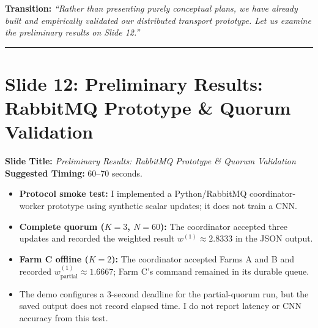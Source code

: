 \documentclass[11pt,a4paper]{article}
\begin{document}
\textbf{Transition:} \textit{``Rather than presenting purely conceptual plans, we have already built and empirically validated our distributed transport prototype. Let us examine the preliminary results on Slide 12.''}

\vspace{0.35cm}\hrule\vspace{0.35cm}

\section{Slide 12: Preliminary Results: RabbitMQ Prototype \& Quorum Validation}
\textbf{Slide Title:} \textit{Preliminary Results: RabbitMQ Prototype \& Quorum Validation} \\
\textbf{Suggested Timing:} 60--70 seconds.

\begin{tcolorbox}[colframe=primaryblue, title=\textbf{Key Distributed Systems Points to Emphasize}]
\begin{itemize}[leftmargin=*]
    \item \textbf{Protocol smoke test:} I implemented a Python/RabbitMQ coordinator-worker prototype using synthetic scalar updates; it does not train a CNN.
    \item \textbf{Complete quorum ($K=3$, $N=60$):} The coordinator accepted three updates and recorded the weighted result $w^{(1)} \approx 2.8333$ in the JSON output.
    \item \textbf{Farm C offline ($K=2$):} The coordinator accepted Farms A and B and recorded $w^{(1)}_{\text{partial}} \approx 1.6667$; Farm C's command remained in its durable queue.
    \item The demo configures a 3-second deadline for the partial-quorum run, but the saved output does not record elapsed time. I do not report latency or CNN accuracy from this test.
\end{itemize}
\end{tcolorbox}
\end{document}
